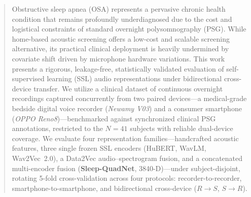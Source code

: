\documentclass[conference]{IEEEtran}
\begin{document}
\begin{abstract}
Obstructive sleep apnea (OSA) represents a pervasive chronic health condition that remains profoundly underdiagnosed due to the cost and logistical constraints of standard overnight polysomnography (PSG). While home-based acoustic screening offers a low-cost and scalable screening alternative, its practical clinical deployment is heavily undermined by covariate shift driven by microphone hardware variations. This work presents a rigorous, leakage-free, statistically validated evaluation of self-supervised learning (SSL) audio representations under bidirectional cross-device transfer. We utilize a clinical dataset of continuous overnight recordings captured concurrently from two paired devices---a medical-grade bedside digital voice recorder (\emph{Newamy V03}) and a consumer smartphone (\emph{OPPO Reno8})---benchmarked against synchronized clinical PSG annotations, restricted to the $N=41$ subjects with reliable dual-device coverage. We evaluate four representation families---handcrafted acoustic features, three single frozen SSL encoders (HuBERT, WavLM, Wav2Vec~2.0), a Data2Vec audio--spectrogram fusion, and a concatenated multi-encoder fusion (\textbf{Sleep-QuadNet}, 3840-D)---under subject-disjoint, rotating 5-fold cross-validation across four protocols: recorder-to-recorder, smartphone-to-smartphone, and bidirectional cross-device ($R\rightarrow S$, $S\rightarrow R$).


\end{abstract}
\end{document}
